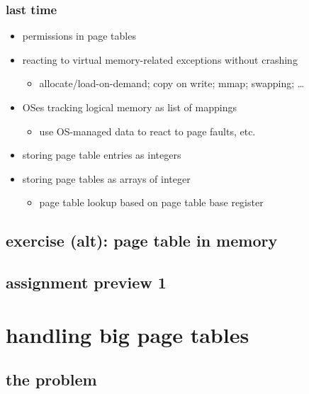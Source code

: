 \date{}
\title{}
\date{}

\begin{frame}
    \titlepage
\end{frame}



\begin{frame}
\frametitle{last time}
\begin{itemize}
\item permissions in page tables
\item reacting to virtual memory-related exceptions without crashing
    \begin{itemize}
    \item allocate/load-on-demand; copy on write; mmap; swapping; \ldots
    \end{itemize}
\item OSes tracking logical memory as list of mappings
    \begin{itemize}
    \item use OS-managed data to react to page faults, etc.
    \end{itemize}
\item storing page table entries as integers
\item storing page tables as arrays of integer
    \begin{itemize}
    \item page table lookup based on page table base register
    \end{itemize}
\end{itemize}
\end{frame}

\subsection{exercise (alt): page table in memory}


\subsection{assignment preview 1}





\section{handling big page tables}
\subsection{the problem}



